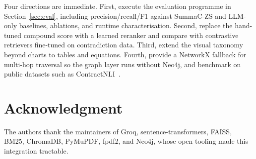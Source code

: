 \documentclass[conference]{IEEEtran}
\begin{document}
Four directions are immediate. First, execute the evaluation programme in Section~\ref{sec:eval}, including precision/recall/F1 against SummaC-ZS and LLM-only baselines, ablations, and runtime characterisation. Second, replace the hand-tuned compound score with a learned reranker and compare with contrastive retrievers fine-tuned on contradiction data. Third, extend the visual taxonomy beyond charts to tables and equations. Fourth, provide a NetworkX fallback for multi-hop traversal so the graph layer runs without Neo4j, and benchmark on public datasets such as ContractNLI~\cite{b13}.

\section*{Acknowledgment}
The authors thank the maintainers of Groq, sentence-transformers, FAISS, BM25, ChromaDB, PyMuPDF, fpdf2, and Neo4j, whose open tooling made this integration tractable.
\end{document}
